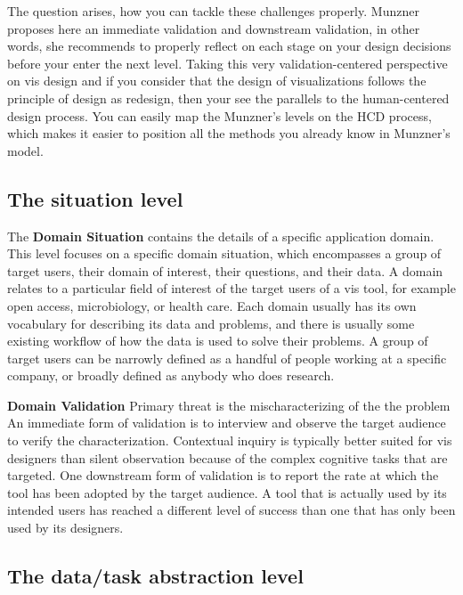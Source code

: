 \documentclass[
]{book}
\begin{document}
The question arises, how you can tackle these challenges properly. Munzner proposes here an immediate validation and downstream validation, in other words, she recommends to properly reflect on each stage on your design decisions before your enter the next level. Taking this very validation-centered perspective on vis design and if you consider that the design of visualizations follows the principle of design as redesign, then your see the parallels to the human-centered design process. You can easily map the Munzner's levels on the HCD process, which makes it easier to position all the methods you already know in Munzner's model.

\hypertarget{the-situation-level}{%
\subsection{The situation level}\label{the-situation-level}}

The \textbf{Domain Situation} contains the details of a specific application domain. This level focuses on a specific domain situation, which encompasses a group of target users, their domain of interest, their questions, and their data. A domain relates to a particular field of interest of the target users of a vis tool, for example open access, microbiology, or health care. Each domain usually has its own vocabulary for describing its data and problems, and there is usually some existing workflow of how the data is used to solve their problems. A group of target users can be narrowly defined as a handful of people working at a specific company, or broadly defined as anybody who does research.

\textbf{Domain Validation} Primary threat is the mischaracterizing of the the problem
An immediate form of validation is to interview and observe the target audience to verify the characterization. Contextual inquiry is typically better suited for vis designers than silent observation because of the complex cognitive tasks that are targeted.
One downstream form of validation is to report the rate at which the tool has been adopted by the target audience. A tool that is actually used by its intended users has reached a different level of success than one that has only been used by its designers.

\hypertarget{the-datatask-abstraction-level}{%
\subsection{The data/task abstraction level}\label{the-datatask-abstraction-level}}
\end{document}
